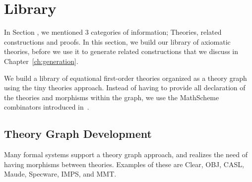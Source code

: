 \chapter{Library}


In Section , we mentioned $3$ categories of information; Theories, related constructions and proofs. In this section, we build our library of axiomatic theories, before we use it to generate related constructions that we discuss in Chapter~\ref{ch:generation}. 

We build a library of equational first-order theories organized as a theory graph using the tiny theories approach. Instead of having to provide all declaration of the theories and morphisms within the graph, we use the MathScheme combinators introduced in~\cite{CaretteOConnorTPC, carette2018building}. 


\begin{comment}
To test our generation algorithms, we needed a large library of equational theories. As we have discussed in Section~\ref{sec:broader_context}, we work in the favor of a library organized as a theory graph, believing that it leverages the structure of mathematical knowledge. Arrows of the graph are the means to relating the different theories. In this section, we present our approach to building a library that emphasizes these connections. 

In Section~\ref{sec:thry_based_libs} we discuss the motivation behind building such a library. In Section~\ref{sec:ms_combinators} we present the combinators used in building it and discuss how they are arrow based. Section~\ref{sec:lib_implementation}, discusses the challenges of the implementation of the combinators to build a theory graph. We finally show some interesting cases of library definitions in Section~\ref{sec:interesting_cases}. 
\end{comment}


\section{Theory Graph Development}
\label{sec:thry_graph_in_action}
Many formal systems support a theory graph approach, and realizes the need of having morphisms between theories. Examples of these are Clear, OBJ, CASL, Maude, Specware, IMPS, and MMT. 

